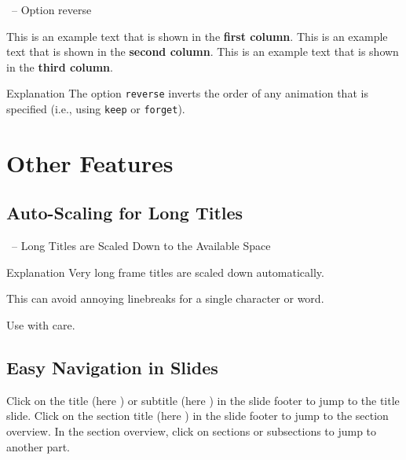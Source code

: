 \documentclass[
	aspectratio=169, %
	8pt, %
]{beamer}
\begin{document}
\begin{frame}[label=current]{\insertsubsection\ -- Option reverse}
	\begin{fancycolumns}[columns=3,forget,reverse]
		This is an example text that is shown in the \textbf{first column}.
	\nextcolumn
		This is an example text that is shown in the \textbf{second column}.
	\nextcolumn
		This is an example text that is shown in the \textbf{third column}.
	\end{fancycolumns}
	\vfill
	\begin{info}{Explanation}
		The option \texttt{reverse} inverts the order of any animation that is specified (i.e., using \texttt{keep} or \texttt{forget}).
	\end{info}
\end{frame}

\section{Other Features}

\subsection{Auto-Scaling for Long Titles}
\begin{frame}{\insertsubsection\ -- Long Titles are Scaled Down to the Available Space}
	\begin{info}{Explanation}
		Very long frame titles are scaled down automatically.

		\hfill\hfill\hfill This can avoid annoying linebreaks for a single character or word.\hfill~

		\hfill Use with care.
	\end{info}
\end{frame}

\subsection{Easy Navigation in Slides}
\begin{frame}{\insertsubsection}
	\vfill
	Click on the title (here \textbf{\insertshorttitle}) or subtitle (here \textbf{\insertshortsubtitle}) in the slide footer to jump to the title slide.
	\vfill
	Click on the section title (here \textbf{\insertsection}) in the slide footer to jump to the section overview.
	\vfill
	In the section overview, click on sections or subsections to jump to another part.
	\vfill
\end{frame}
\end{document}

